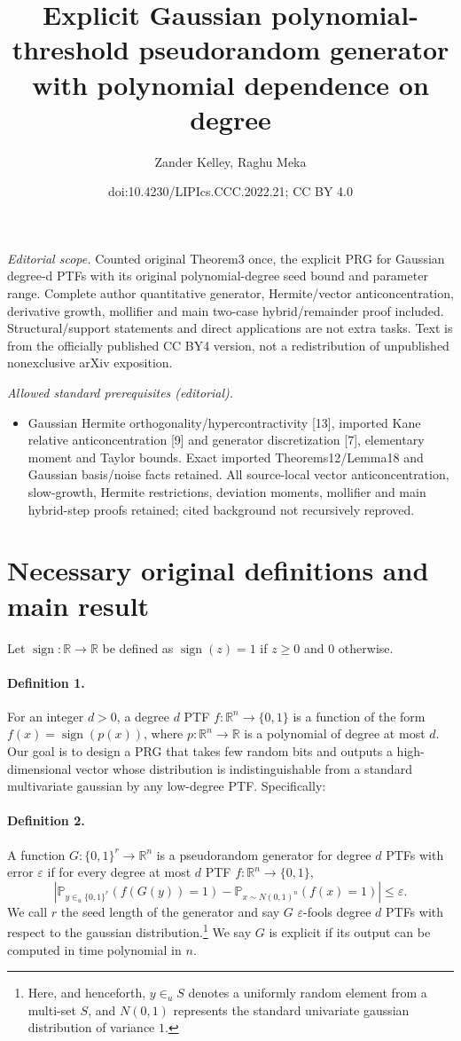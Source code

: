 \documentclass[10pt,a4paper]{article}
\title{Explicit Gaussian polynomial-threshold pseudorandom generator with polynomial dependence on degree}
\author{Zander Kelley, Raghu Meka}
\date{doi:10.4230/LIPIcs.CCC.2022.21; CC BY 4.0}
\begin{document}
\maketitle
\noindent\textit{Editorial scope.} Counted original Theorem3 once, the explicit PRG for Gaussian degree-d PTFs with its original polynomial-degree seed bound and parameter range. Complete author quantitative generator, Hermite/vector anticoncentration, derivative growth, mollifier and main two-case hybrid/remainder proof included. Structural/support statements and direct applications are not extra tasks. Text is from the officially published CC BY4 version, not a redistribution of unpublished nonexclusive arXiv exposition.\par\medskip
\noindent\textit{Allowed standard prerequisites (editorial).}\begin{itemize}
\item Gaussian Hermite orthogonality/hypercontractivity [13], imported Kane relative anticoncentration [9] and generator discretization [7], elementary moment and Taylor bounds. Exact imported Theorems12/Lemma18 and Gaussian basis/noise facts retained. All source-local vector anticoncentration, slow-growth, Hermite restrictions, deviation moments, mollifier and main hybrid-step proofs retained; cited background not recursively reproved.
\end{itemize}\medskip
\section*{Necessary original definitions and main result}
Let $\operatorname{sign}:\mathbb R\to\mathbb R$ be defined as $\operatorname{sign}(z)=1$ if $z\geq0$ and $0$ otherwise.
\paragraph{Definition 1.} For an integer $d>0$, a degree $d$ PTF $f:\mathbb R^n\to\{0,1\}$ is a function of the form $f(x)=\operatorname{sign}(p(x))$, where $p:\mathbb R^n\to\mathbb R$ is a polynomial of degree at most $d$.
Our goal is to design a PRG that takes few random bits and outputs a high-dimensional vector whose distribution is indistinguishable from a standard multivariate gaussian by any low-degree PTF. Specifically:
\paragraph{Definition 2.} A function $G:\{0,1\}^r\to\mathbb R^n$ is a pseudorandom generator for degree $d$ PTFs with error $\varepsilon$ if for every degree at most $d$ PTF $f:\mathbb R^n\to\{0,1\}$,
\[\left|\mathbb P_{y\in_u\{0,1\}^r}(f(G(y))=1)-\mathbb P_{x\sim N(0,1)^n}(f(x)=1)\right|\leq\varepsilon.\]
We call $r$ the seed length of the generator and say $G$ $\varepsilon$-fools degree $d$ PTFs with respect to the gaussian distribution.\footnote{Here, and henceforth, $y\in_u S$ denotes a uniformly random element from a multi-set $S$, and $N(0,1)$ represents the standard univariate gaussian distribution of variance $1$.} We say $G$ is explicit if its output can be computed in time polynomial in $n$.
\end{document}

